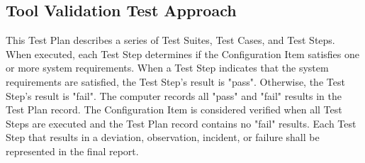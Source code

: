 \subsection{Tool Validation Test Approach}
This Test Plan describes a series of Test Suites, Test Cases, and Test Steps.
When executed, each Test Step determines if the Configuration Item satisfies one
or more system requirements.  When a Test Step indicates that the system
requirements are satisfied, the Test Step's result is "pass".  Otherwise, the
Test Step's result is "fail".  The computer records all "pass" and "fail"
results in the Test Plan record.  The Configuration Item is considered
verified when all Test Steps are executed and the Test Plan record contains
no "fail" results.  Each Test Step that results in a deviation, observation,
incident, or failure shall be represented in the final report.
